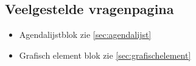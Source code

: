 \subsection{Veelgestelde vragenpagina}
\label{sec:veelgesteldevragen}

\begin{itemize}
  \item Agendalijstblok zie \ref{sec:agendalijst}
  \item Grafisch element blok zie \ref{sec:grafischelement}
\end{itemize}